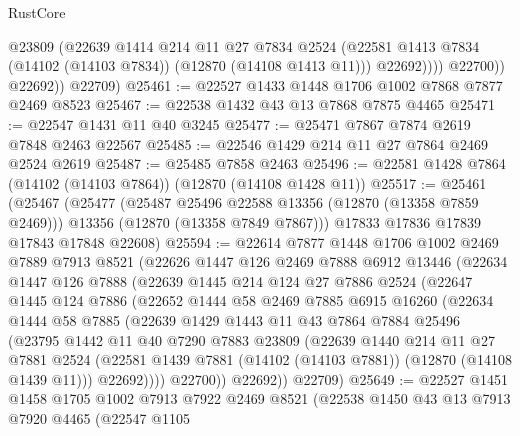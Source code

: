 \begin{lexlean}{RustCore}
\begin{coremodule}
                    @23809
                    (@22639
                      @1414
                      @214
                      @11
                      @27
                      @7834
                      @2524
                      (@22581 @1413 @7834 (@14102 (@14103 @7834)) (@12870 (@14108 @1413 @11)))
                      @22692))))
              @22700))
          @22692))
      @22709)
@25461 := @22527 @1433 @1448 @1706 @1002 @7868 @7877 @2469 @8523
@25467 := @22538 @1432 @43 @13 @7868 @7875 @4465
@25471 := @22547 @1431 @11 @40 @3245
@25477 := @25471 @7867 @7874 @2619 @7848 @2463 @22567
@25485 := @22546 @1429 @214 @11 @27 @7864 @2469 @2524 @2619
@25487 := @25485 @7858 @2463
@25496 := @22581 @1428 @7864 (@14102 (@14103 @7864)) (@12870 (@14108 @1428 @11))
@25517 := @25461
    (@25467
      (@25477
        (@25487 @25496 @22588 @13356 (@12870 (@13358 @7859 @2469)))
        @13356
        (@12870 (@13358 @7849 @7867)))
      @17833
      @17836
      @17839
      @17843
      @17848
      @22608)
@25594 := @22614
    @7877
    @1448
    @1706
    @1002
    @2469
    @7889
    @7913
    @8521
    (@22626
      @1447
      @126
      @2469
      @7888
      @6912
      @13446
      (@22634
        @1447
        @126
        @7888
        (@22639
          @1445
          @214
          @124
          @27
          @7886
          @2524
          (@22647
            @1445
            @124
            @7886
            (@22652
              @1444
              @58
              @2469
              @7885
              @6915
              @16260
              (@22634
                @1444
                @58
                @7885
                (@22639
                  @1429
                  @1443
                  @11
                  @43
                  @7864
                  @7884
                  @25496
                  (@23795
                    @1442
                    @11
                    @40
                    @7290
                    @7883
                    @23809
                    (@22639
                      @1440
                      @214
                      @11
                      @27
                      @7881
                      @2524
                      (@22581 @1439 @7881 (@14102 (@14103 @7881)) (@12870 (@14108 @1439 @11)))
                      @22692))))
              @22700))
          @22692))
      @22709)
@25649 := @22527
    @1451
    @1458
    @1705
    @1002
    @7913
    @7922
    @2469
    @8521
    (@22538
      @1450
      @43
      @13
      @7913
      @7920
      @4465
      (@22547
        @1105

\end{coremodule}
\end{lexlean}
